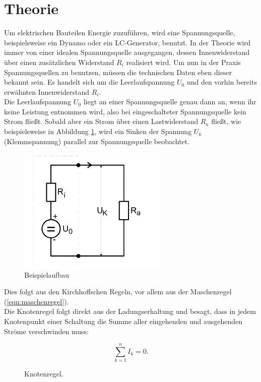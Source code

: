 \section{Theorie}
\label{sec:Theorie}
Um elektrischen Bauteilen Energie zuzuführen, wird eine Spannungsquelle, beispielsweise ein Dynamo oder ein LC-Generator, benutzt.
In der Theorie wird immer von einer idealen Spannungsquelle ausgegangen, dessen Innenwiderstand über einen zusätzlichen Widerstand $R_i$ realisiert wird.
Um nun in der Praxis Spannungsquellen zu benutzen, müssen die technischen Daten eben dieser bekannt sein.
Es handelt sich um die Leerlaufspannung $U_0$ und den vorhin bereits erwähnten Innenwiderstand $R_i$.\\
Die Leerlaufspannung $U_0$ liegt an einer Spannungsquelle genau dann an, wenn ihr keine Leistung entnommen wird, also bei eingeschalteter Spannungsquelle kein Strom fließt.
Sobald aber ein Strom über einen Lastwiderstand $R_a$ fließt, wie beispielsweise in Abbildung \ref{fig:t1}, wird ein Sinken der Spannung $U_k$ (Klemmspannung) parallel zur Spannungsquelle beobachtet.

\begin{figure}[H]
  \centering
  \includegraphics[height=6cm]{innenwiderstand.png}
  \caption{Beispielaufbau \cite{sample}}
  \label{fig:t1}
\end{figure}

Dies folgt aus den Kirchhoffschen Regeln, vor allem aus der Maschenregel (\ref{eqn:maschenregel}).\\
Die Knotenregel folgt direkt aus der Ladungserhaltung und besagt, dass in jedem Knotenpunkt einer Schaltung die Summe aller eingehenden und ausgehenden Ströme verschwinden muss:

\begin{equation}
  \sum_{k=1}^n I_k = 0.
  \label{eqn:knotenregel}
\end{equation}

\begin{figure}[H]
  \centering
  \caption{Knotenregel.}
  \label{fig:knotenregel}
\end{figure}

